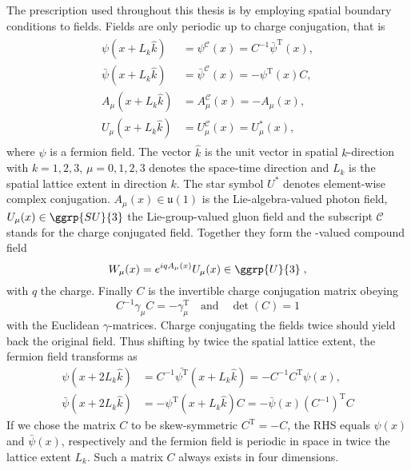 The prescription used throughout this thesis is  by employing spatial \Cstar boundary conditions to fields.
Fields are only periodic up to charge conjugation, that is
\begin{align} \label{eq:cstar:bcs}
  \begin{split}
    \psi(x + L_k \hat{k})       &= \psi^{\mathcal{C}}(x)       = C^{-1}\bar{\psi}^{\text{T}}(x), \\
    \bar{\psi}(x + L_k \hat{k}) &= \bar{\psi}^{\mathcal{C}}(x) = -\psi^{\text{T}}(x)C, \\
    A_{\mu}(x + L_k \hat{k})    &= A_{\mu}^{\mathcal{C}}(x)    = - A_{\mu}(x), \\
    U_{\mu}(x + L_k \hat{k})    &= U_{\mu}^{\mathcal{C}}(x)    = U_{\mu}^{*}(x),
  \end{split}
\end{align}
where $\psi$ is a fermion field.
The vector $\hat{k}$ is the unit vector in spatial $k$-direction with $k=1,2,3$, $\mu=0,1,2,3$ denotes the space-time direction and $L_k$ is the spatial lattice extent in direction $k$.
The star symbol $U^{*}$ denotes element-wise complex conjugation.
$A_{\mu}(x) \in \mathfrak{u}(1)$ is the Lie-algebra-valued photon field, $U_{\mu}(x) \in \ggrp{SU}{3}$ the Lie-group-valued gluon field and the subscript $\mathcal{C}$ stands for the charge conjugated field.
Together they form the -valued compound field
\begin{equation}
W_{\mu}(x) = e^{i q A_\mu(x)} U_\mu(x) \in \ggrp{U}{3} \;,
\end{equation}
with $q$ the charge.
Finally $C$ is the invertible charge conjugation matrix obeying
\begin{equation}
  C^{-1} \gamma_{\mu} C = - \gamma_{\mu}^{\text{T}}
  \quad
  \text{and}
  \quad
  \det(C) = 1
\end{equation}
with the Euclidean $\gamma$-matrices.
Charge conjugating the fields twice should yield back the original field.
Thus shifting by twice the spatial lattice extent, the fermion field transforms as
\begin{align}
  \psi(x + 2 L_k \hat{k}) &= C^{-1}\bar{\psi^{\text{T}}}(x + L_k \hat{k}) = - C^{-1} C^{\text{T}} \psi(x), \\
  \bar{\psi}(x + 2 L_k \hat{k}) &= -\psi^{\text{T}}(x + L_k \hat{k})C = - \bar{\psi}(x) (C^{-1})^{\text{T}} C
\end{align}
If we chose the matrix $C$ to be skew-symmetric $C^{\text{T}} = -C$, the RHS equals $\psi(x)$ and $\bar{\psi}(x)$, respectively and the fermion field is periodic in space in twice the lattice extent $L_k$. Such a matrix $C$ always exists in four dimensions.

